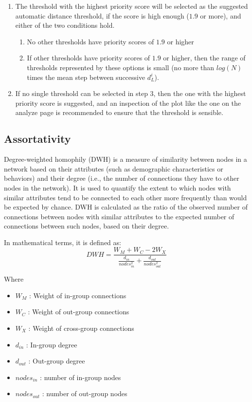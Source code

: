\documentclass[utf8]{FrontiersinHarvard} %
\begin{document}
\begin{enumerate}
  \item{The threshold with the highest priority score will be selected as the suggested automatic distance threshold, if the score is high enough ($1.9$ or more), and either of the two conditions hold.
    \begin{enumerate}
      \item{No other thresholds have priority scores of $1.9$ or higher}
      \item{If other thresholds have priority scores of $1.9$ or higher, then the range of thresholds represented by these options is small (no more than $log(N)$ times the mean step between successive $d_L^i$).}
    \end{enumerate}}

 \item{If no single threshold can be selected in step 3, then the one with the highest priority score is suggested, and an inspection of the plot like the one on the analyze page is recommended to ensure that the threshold is sensible.}
\end{enumerate}

\subsection{Assortativity}

Degree-weighted homophily (DWH) is a measure of similarity between nodes in a network based on their attributes (such as demographic characteristics or behaviors) and their degree (i.e., the number of connections they have to other nodes in the network). It is used to quantify the extent to which nodes with similar attributes tend to be connected to each other more frequently than would be expected by chance.
DWH is calculated as the ratio of the observed number of connections between nodes with similar attributes to the expected number of connections between such nodes, based on their degree.

In mathematical terms, it is defined as:
\begin{equation}
  DWH = \frac{W_M + W_C - 2W_X}{\frac{d_{in}}{nodes_{in}^2} + \frac{d_{out}}{nodes_{out}^2}}
\end{equation}

Where
\begin{itemize}
  \item{$W_M$ : Weight of in-group connections}
  \item{$W_C$ : Weight of out-group connections}
  \item{$W_X$ : Weight of cross-group connections}
  \item{$d_{in}$ : In-group degree}
  \item{$d_{out}$ : Out-group degree}
  \item{$nodes_{in}$ : number of in-group nodes}
  \item{$nodes_{out}$ : number of out-group nodes}
\end{itemize}
\end{document}
